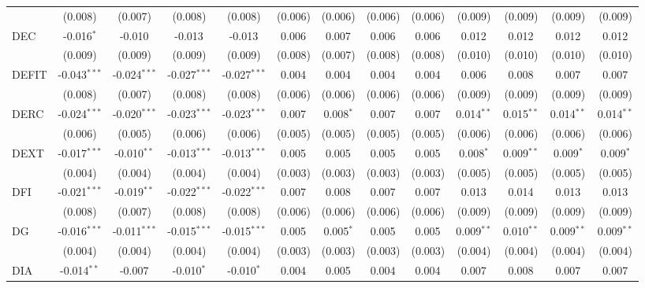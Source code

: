 \begin{table}[!htbp]
\begin{tabular}{@{\extracolsep{5pt}}lcccccccccccc}
  & (0.008) & (0.007) & (0.008) & (0.008) & (0.006) & (0.006) & (0.006) & (0.006) & (0.009) & (0.009) & (0.009) & (0.009) \\
 DEC & -0.016$^{*}$ & -0.010$^{}$ & -0.013$^{}$ & -0.013$^{}$ & 0.006$^{}$ & 0.007$^{}$ & 0.006$^{}$ & 0.006$^{}$ & 0.012$^{}$ & 0.012$^{}$ & 0.012$^{}$ & 0.012$^{}$ \\
  & (0.009) & (0.009) & (0.009) & (0.009) & (0.008) & (0.007) & (0.008) & (0.008) & (0.010) & (0.010) & (0.010) & (0.010) \\
 DEFIT & -0.043$^{***}$ & -0.024$^{***}$ & -0.027$^{***}$ & -0.027$^{***}$ & 0.004$^{}$ & 0.004$^{}$ & 0.004$^{}$ & 0.004$^{}$ & 0.006$^{}$ & 0.008$^{}$ & 0.007$^{}$ & 0.007$^{}$ \\
  & (0.008) & (0.007) & (0.008) & (0.008) & (0.006) & (0.006) & (0.006) & (0.006) & (0.009) & (0.009) & (0.009) & (0.009) \\
 DERC & -0.024$^{***}$ & -0.020$^{***}$ & -0.023$^{***}$ & -0.023$^{***}$ & 0.007$^{}$ & 0.008$^{*}$ & 0.007$^{}$ & 0.007$^{}$ & 0.014$^{**}$ & 0.015$^{**}$ & 0.014$^{**}$ & 0.014$^{**}$ \\
  & (0.006) & (0.005) & (0.006) & (0.006) & (0.005) & (0.005) & (0.005) & (0.005) & (0.006) & (0.006) & (0.006) & (0.006) \\
 DEXT & -0.017$^{***}$ & -0.010$^{**}$ & -0.013$^{***}$ & -0.013$^{***}$ & 0.005$^{}$ & 0.005$^{}$ & 0.005$^{}$ & 0.005$^{}$ & 0.008$^{*}$ & 0.009$^{**}$ & 0.009$^{*}$ & 0.009$^{*}$ \\
  & (0.004) & (0.004) & (0.004) & (0.004) & (0.003) & (0.003) & (0.003) & (0.003) & (0.005) & (0.005) & (0.005) & (0.005) \\
 DFI & -0.021$^{***}$ & -0.019$^{**}$ & -0.022$^{***}$ & -0.022$^{***}$ & 0.007$^{}$ & 0.008$^{}$ & 0.007$^{}$ & 0.007$^{}$ & 0.013$^{}$ & 0.014$^{}$ & 0.013$^{}$ & 0.013$^{}$ \\
  & (0.008) & (0.007) & (0.008) & (0.008) & (0.006) & (0.006) & (0.006) & (0.006) & (0.009) & (0.009) & (0.009) & (0.009) \\
 DG & -0.016$^{***}$ & -0.011$^{***}$ & -0.015$^{***}$ & -0.015$^{***}$ & 0.005$^{}$ & 0.005$^{*}$ & 0.005$^{}$ & 0.005$^{}$ & 0.009$^{**}$ & 0.010$^{**}$ & 0.009$^{**}$ & 0.009$^{**}$ \\
  & (0.004) & (0.004) & (0.004) & (0.004) & (0.003) & (0.003) & (0.003) & (0.003) & (0.004) & (0.004) & (0.004) & (0.004) \\
 DIA & -0.014$^{**}$ & -0.007$^{}$ & -0.010$^{*}$ & -0.010$^{*}$ & 0.004$^{}$ & 0.005$^{}$ & 0.004$^{}$ & 0.004$^{}$ & 0.007$^{}$ & 0.008$^{}$ & 0.007$^{}$ & 0.007$^{}$ \\

\end{tabular}
\end{table}
